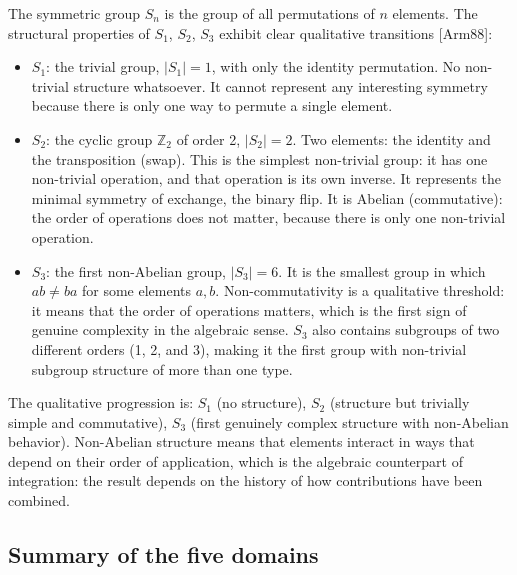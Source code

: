 \documentclass[12pt]{article}
\begin{document}
The symmetric group \(S_n\) is the group of all permutations of \(n\)
elements. The structural properties of \(S_1\), \(S_2\), \(S_3\) exhibit
clear qualitative transitions {[}Arm88{]}:

\begin{itemize}
\item
  \(S_1\): the trivial group, \(|S_1| = 1\), with only the identity
  permutation. No non-trivial structure whatsoever. It cannot represent
  any interesting symmetry because there is only one way to permute a
  single element.
\item
  \(S_2\): the cyclic group \(\mathbb{Z}_2\) of order 2, \(|S_2| = 2\).
  Two elements: the identity and the transposition (swap). This is the
  simplest non-trivial group: it has one non-trivial operation, and that
  operation is its own inverse. It represents the minimal symmetry of
  exchange, the binary flip. It is Abelian (commutative): the order of
  operations does not matter, because there is only one non-trivial
  operation.
\item
  \(S_3\): the first non-Abelian group, \(|S_3| = 6\). It is the
  smallest group in which \(ab \neq ba\) for some elements \(a, b\).
  Non-commutativity is a qualitative threshold: it means that the order
  of operations matters, which is the first sign of genuine complexity
  in the algebraic sense. \(S_3\) also contains subgroups of two
  different orders (1, 2, and 3), making it the first group with
  non-trivial subgroup structure of more than one type.
\end{itemize}

The qualitative progression is: \(S_1\) (no structure), \(S_2\)
(structure but trivially simple and commutative), \(S_3\) (first
genuinely complex structure with non-Abelian behavior). Non-Abelian
structure means that elements interact in ways that depend on their
order of application, which is the algebraic counterpart of integration:
the result depends on the history of how contributions have been
combined.

\subsection{Summary of the five domains}\label{summary-of-the-five-domains}
\end{document}
